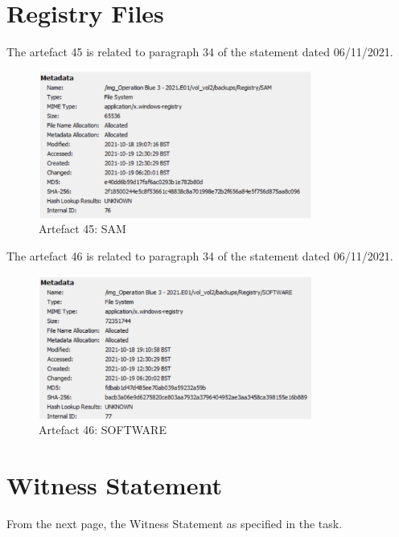 \section{Registry Files}
\label{s:registry}
The artefact 45 is related to paragraph 34 of the statement dated 06/11/2021.
\begin{figure}[H]
  \centering
  \includegraphics[width=0.8\textwidth]{figures/meta45}
  \caption{Artefact 45: SAM}
  \label{f:meta45}
\end{figure}
The artefact 46 is related to paragraph 34 of the statement dated 06/11/2021.
\begin{figure}[H]
  \centering
  \includegraphics[width=0.8\textwidth]{figures/meta46}
  \caption{Artefact 46: SOFTWARE}
  \label{f:meta46}
\end{figure}

\section{Witness Statement}
\label{s:witness-statement}
From the next page, the Witness Statement as specified in the task.
